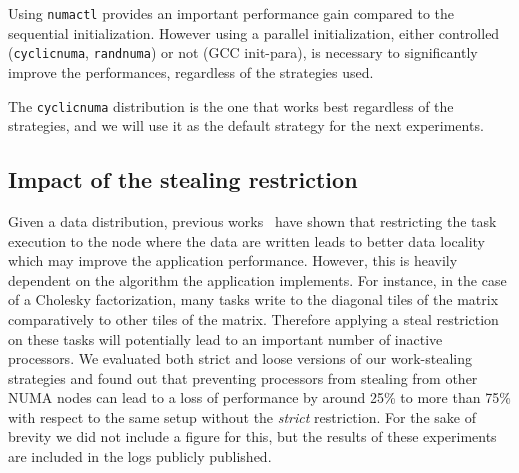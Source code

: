 \documentclass[parallelisme]{compas2016}
\begin{document}
Using \verb/numactl/ provides an important performance gain compared to the sequential initialization.
However using a parallel initialization, either controlled (\verb/cyclicnuma/, \verb/randnuma/) or
not (GCC init-para), is necessary to significantly improve the performances, regardless of the strategies used.

The \verb/cyclicnuma/ distribution is the one that works best regardless of
the strategies, and we will use it as the default strategy for the next experiments.



\subsection{Impact of the stealing restriction}

Given a data distribution, previous works~\cite{Olivier:2012:CMW:2388996.2389085}
have shown that restricting the task execution to the node where the data are
written leads to better data locality which may improve the application performance.
However, this is heavily dependent on the algorithm the application implements. For instance, in the case
of a Cholesky factorization, many tasks write to the diagonal tiles
of the matrix comparatively to other tiles of the matrix. Therefore applying
a steal restriction on these tasks will potentially lead to an important number
of inactive processors.
We evaluated both strict and loose versions of our work-stealing strategies and found
out that preventing processors from stealing from other NUMA nodes can lead to a loss of performance by
around 25\% to more than 75\% with respect to the same setup without the \emph{strict}
restriction.
For the sake of brevity we did not include a figure for this, but the results of these
experiments are included in the logs publicly published.
\end{document}
